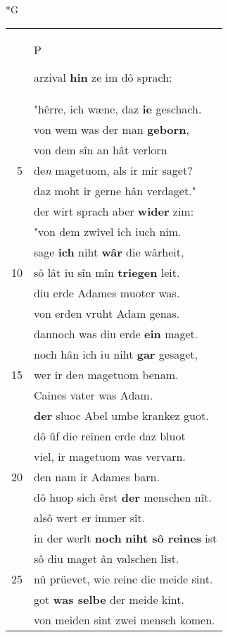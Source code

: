 \documentclass[8pt,a4paper,notitlepage]{article}
\begin{document}
\begin{table}[ht]
\begin{minipage}[t]{0.5\linewidth}
\small
\begin{center}*G
\end{center}
\begin{tabular}{rl}
 & \begin{large}P\end{large}arzival \textbf{hin} ze im dô sprach:\\ 
 & "hêrre, ich wæne, daz \textbf{ie} geschach.\\ 
 & von wem was der man \textbf{geborn},\\ 
 & von dem sîn an hât verlorn\\ 
5 & de\textit{n} magetuom, als ir mir saget?\\ 
 & daz moht ir gerne hân verdaget."\\ 
 & der wirt sprach aber \textbf{wider} zim:\\ 
 & "von dem zwîvel ich iuch nim.\\ 
 & sage \textbf{ich} niht \textbf{wâr} die wârheit,\\ 
10 & sô lât iu sîn mîn \textbf{triegen} leit.\\ 
 & diu erde Adames muoter was.\\ 
 & von erden vruht Adam genas.\\ 
 & dannoch was diu erde \textbf{ein} maget.\\ 
 & noch hân ich iu niht \textbf{gar} gesaget,\\ 
15 & wer ir de\textit{n} magetuom benam.\\ 
 & Caines vater was Adam.\\ 
 & \textbf{der} sluoc Abel umbe krankez guot.\\ 
 & dô ûf die reinen erde daz bluot\\ 
 & viel, ir magetuom was vervarn.\\ 
20 & den nam ir Adames barn.\\ 
 & dô huop sich êrst \textbf{der} menschen nît.\\ 
 & alsô wert er immer sît.\\ 
 & in der werlt \textbf{noch} \textbf{niht sô reines} ist\\ 
 & sô diu maget ân valschen list.\\ 
25 & nû prüevet, wie reine die meide sint.\\ 
 & got \textbf{was selbe} der meide kint.\\ 
 & von meiden sint zwei mensch komen.\\ 

\end{tabular}
\end{minipage}
\end{table}
\end{document}

